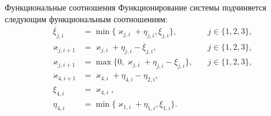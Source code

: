 \documentclass[10pt]{beamer}
\begin{document}
\begin{frame}{Функциональные соотношения }
Функционирование системы подчиняется следующим функциональным соотношениям:
\begin{equation}
\begin{aligned}
\overline{\xi}_{j,i}&=\min\{\varkappa_{j,i}+\eta_{j,i},\xi_{j,i}\}, \quad & j\in \{1,2,3\},\\
\varkappa_{j,i+1}&=\varkappa_{j,i}+\eta_{j,i}-\overline{\xi}_{j,i}, \quad & j\in \{1,2,3\},\\
\varkappa_{j,i+1}&=\max\{{0,\varkappa_{j,i}+\eta_{j,i}-\xi_{j,i}}\}, \quad & j\in \{1,2,3\},\\
\varkappa_{4,i+1}&=\varkappa_{4,i}+\eta_{4,i}-\eta_{2,i}, \quad &\\
\xi_{4,i} & = \varkappa_{4,i}, & \\
\eta_{4,i} & = \min\{ \varkappa_{1,i} + \eta_{1,i}, \xi_{1,i}\}.
\end{aligned}
\label{rekk}
\end{equation}
\end{frame}
\end{document}
